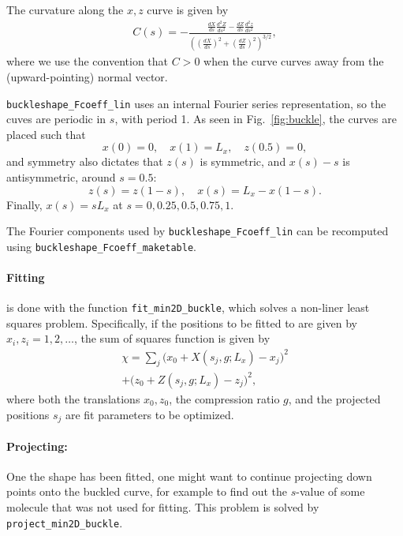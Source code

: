 \documentclass[11pt,a4paper,twocolumn]{article}
\begin{document}
The curvature along the $x,z$ curve is given by
\begin{multline}
  C(s)=-\frac{\frac{dX}{ds}\frac{d^2Z}{ds^2}-\frac{dZ}{ds}\frac{d^2z}{ds^2}}{
    \left(
    \left(\frac{dX}{ds}\right)^2+\left(\frac{dZ}{ds}\right)^2
    \right)^{3/2}},
\end{multline}
where we use the convention that $C>0$ when the curve curves away from
the (upward-pointing) normal vector.

\texttt{buckleshape\_Fcoeff\_lin} uses an internal Fourier series
representation, so the cuves are periodic in $s$, with period 1. As
seen in Fig.~\ref{fig:buckle}, the curves are placed such that
\begin{equation}
x(0)=0,\quad
x(1)=L_x,\quad 
z(0.5)=0,
\end{equation}
and symmetry also dictates that $z(s)$ is symmetric, 
and $x(s)-s$ is antisymmetric,  around $s=0.5$:
\begin{equation}
  z(s)=z(1-s),\quad
  x(s)=L_x-x(1-s).
\end{equation}
Finally, $x(s)=sL_x$ at $s=0,0.25,0.5,0.75,1$.

The Fourier components used by \texttt{buckleshape\_Fcoeff\_lin} can
be recomputed using \texttt{buckleshape\_Fcoeff\_maketable}.

\paragraph{Fitting}
is done with the function \texttt{fit\_min2D\_buckle}, which solves a
non-liner least squares problem. Specifically, if the positions to be
fitted to are given by $x_i,z_i=1,2,\ldots$, the sum of squares
function is given by
\begin{multline}
    \chi=\sum_j
    \big(x_0+X(s_j,g;L_x)-x_j\big)^2\\
   +\big(z_0+Z(s_j,g;L_x)-z_j\big)^2,
\end{multline}
where both the translations $x_0,z_0$, the compression ratio $g$, and
the projected positions $s_j$ are fit parameters to be optimized.
\paragraph{Projecting:}
One the shape has been fitted, one might want to continue projecting
down points onto the buckled curve, for example to find out the
$s$-value of some molecule that was not used for fitting. This problem
is solved by \texttt{project\_min2D\_buckle}.

 

\end{document}
